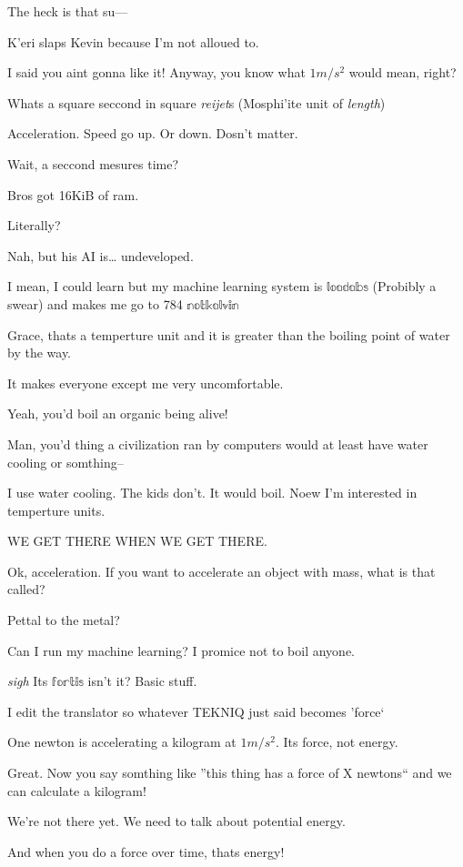 \kev The heck is that su---

K'eri slaps Kevin because I'm not alloued to.

\gr I said you aint gonna like it! Anyway, you know what $1m/s^2$ would mean, right?

\kev Whats a square seccond in square \emph{reijet}s (Mosphi'ite unit of \emph{length})

\tek Acceleration. Speed go up. Or down. Dosn't matter.

\kev Wait, a seccond mesures time?

\ker Bros got 16KiB of ram.

\gr Literally?

\ker Nah, but his AI is\ldots{} undeveloped.

\kev I mean, I could learn but my machine learning system is $\mathbb{loadabs}$ (Probibly a swear) and makes me go to 784 $\mathbb{notkalvin}$

\tek Grace, thats a temperture unit and it is greater than the boiling point of water by the way.

\kev It makes everyone except me very uncomfortable.

\ker Yeah, you'd boil an organic being alive!

\gr Man, you'd thing a civilization ran by computers would at least have water cooling or somthing--

\tek I use water cooling. The kids don't. It would boil. Noew I'm interested in temperture units.

\gr WE GET THERE WHEN WE GET THERE.

\gr Ok, acceleration. If you want to accelerate an object with mass, what is that called?

\ker Pettal to the metal?

\kev Can I run my machine learning? I promice not to boil anyone.

\tek \emph{sigh} Its $\mathbb{fortis}$ isn't it? Basic stuff.

I edit the translator so whatever TEKNIQ just said becomes 'force`



\gr One newton is accelerating a kilogram at $1m/s^2$. Its force, not energy.

\tek Great. Now you say somthing like ''this thing has a force of X newtons`` and we can calculate a kilogram!

\gr We're not there yet. We need to talk about potential energy.\

\ker And when you do a force over time, thats energy!

